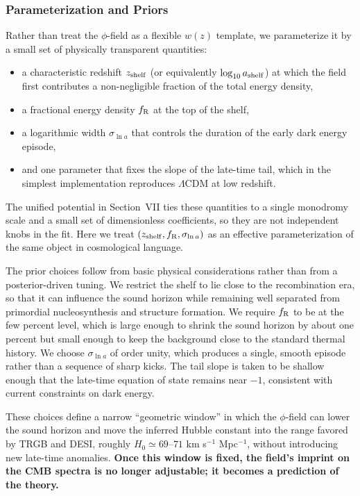 \documentclass[a4paper,11pt]{article}
\begin{document}
\subsubsection{Parameterization and Priors}

Rather than treat the $\phi$-field as a flexible $w(z)$ template, we parameterize it by a small set of physically transparent quantities:
\begin{itemize}
    \item a characteristic redshift $z_{\rm shelf}$ (or equivalently $\log_{10} a_{\rm shelf}$) at which the field first contributes a non-negligible fraction of the total energy density,
    \item a fractional energy density $f_{\rm R}$ at the top of the shelf,
    \item a logarithmic width $\sigma_{\ln a}$ that controls the duration of the early dark energy episode,
    \item and one parameter that fixes the slope of the late-time tail, which in the simplest implementation reproduces $\Lambda$CDM at low redshift.
\end{itemize}

The unified potential in Section~VII ties these quantities to a single monodromy scale and a small set of dimensionless coefficients, so they are not independent knobs in the fit. Here we treat $(z_{\rm shelf}, f_{\rm R}, \sigma_{\ln a})$ as an effective parameterization of the same object in cosmological language.

The prior choices follow from basic physical considerations rather than from a posterior-driven tuning. We restrict the shelf to lie close to the recombination era, so that it can influence the sound horizon while remaining well separated from primordial nucleosynthesis and structure formation. We require $f_{\rm R}$ to be at the few percent level, which is large enough to shrink the sound horizon by about one percent but small enough to keep the background close to the standard thermal history. We choose $\sigma_{\ln a}$ of order unity, which produces a single, smooth episode rather than a sequence of sharp kicks. The tail slope is taken to be shallow enough that the late-time equation of state remains near $-1$, consistent with current constraints on dark energy.

These choices define a narrow ``geometric window'' in which the $\phi$-field can lower the sound horizon and move the inferred Hubble constant into the range favored by TRGB and DESI, roughly $H_{0} \simeq 69$--$71$ km s$^{-1}$ Mpc$^{-1}$, without introducing new late-time anomalies. \textbf{Once this window is fixed, the field's imprint on the CMB spectra is no longer adjustable; it becomes a prediction of the theory.}
\end{document}
